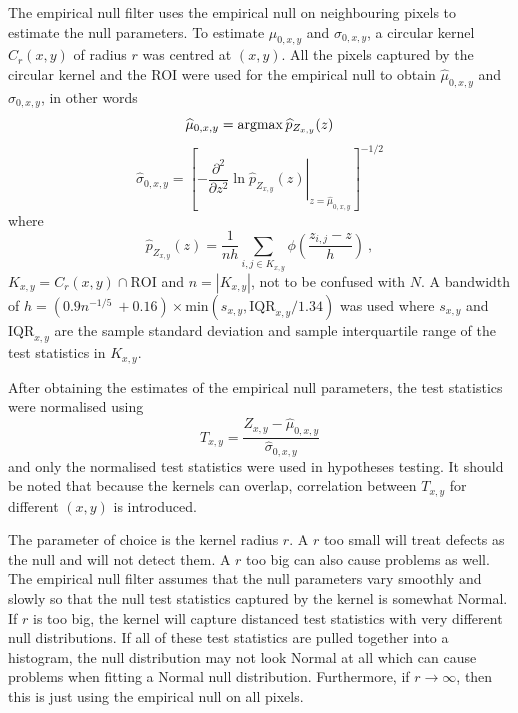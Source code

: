 The empirical null filter uses the empirical null on neighbouring pixels to estimate the null parameters. To estimate $\mu_{0,x,y}$ and $\sigma_{0,x,y}$, a circular kernel $C_r(x,y)$ of radius $r$ was centred at $(x,y)$. All the pixels captured by the circular kernel and the ROI were used for the empirical null to obtain $\widehat{\mu}_{0,x,y}$ and $\widehat{\sigma}_{0,x,y}$, in other words
\begin{equation}
  \widehat{\mu}_{0,x,y} = \operatorname*{argmax}\widehat{p}_{Z_{x,y}}(z)
\end{equation}
\begin{equation}
  \widehat{\sigma}_{0,x,y} = \left[
    \left.
      -\dfrac{\partial^2}{\partial z^2}\ln\widehat{p}_{Z_{x,y}}(z)
    \right|_{z=\widehat{\mu}_{0,x,y}}
  \right]^{-1/2}
\end{equation}
where
\begin{equation}
\widehat{p}_{Z_{x,y}}(z) = 
\frac{1}{nh}
  \sum_{i,j\in K_{x,y}}\phi\left(
    \dfrac{z_{i,j}-z}{h}
  \right) \ ,
\end{equation}
$K_{x,y} = C_r(x,y) \cap \text{ROI}$ and $n=\left|K_{x,y}\right|$, not to be confused with $N$. A bandwidth of $h = (0.9n^{-1/5}\ + 0.16) \times \text{min}\left(s_{x,y},\text{IQR}_{x,y}/1.34\right)$ was used where $s_{x,y}$ and $\text{IQR}_{x,y}$ are the sample standard deviation and sample interquartile range of the test statistics in $K_{x,y}$.

After obtaining the estimates of the empirical null parameters, the test statistics were normalised using
\begin{equation}
  T_{x,y} = 
  \dfrac{
    Z_{x,y}-\widehat{\mu}_{0,x,y}
  }
  {
    \widehat{\sigma}_{0,x,y}
  }
\end{equation}
and only the normalised test statistics were used in hypotheses testing. It should be noted that because the kernels can overlap, correlation between $T_{x,y}$ for different $(x,y)$ is introduced.

The parameter of choice is the kernel radius $r$. A $r$ too small will treat defects as the null and will not detect them. A $r$ too big can also cause problems as well. The empirical null filter assumes that the null parameters vary smoothly and slowly so that the null test statistics captured by the kernel is somewhat Normal. If $r$ is too big, the kernel will capture distanced test statistics with very different null distributions. If all of these test statistics are pulled together into a histogram, the null distribution may not look Normal at all which can cause problems when fitting a Normal null distribution. Furthermore, if $r\rightarrow \infty$, then this is just using the empirical null on all pixels.

